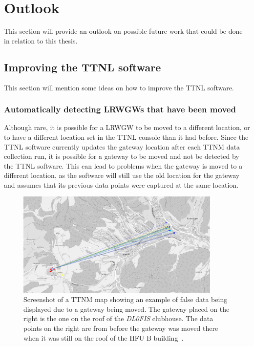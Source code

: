 \section{Outlook}

This section will provide an outlook on possible future work that could be done in relation to this thesis.

\subsection{Improving the \acl{TTNL} software}

This section will mention some ideas on how to improve the \ac{TTNL} software.

\subsubsection{Automatically detecting \aclp{LRWGW} that have been moved}

Although rare, it is possible for a \acl{LRWGW} to be moved to a different location, or to have a different location set in the \ac{TTNL} console than it had before.
Since the \ac{TTNL} software currently updates the gateway location after each \ac{TTNM} data collection run, it is possible for a gateway to be moved and not be detected by the \ac{TTNL} software.
This can lead to problems when the gateway is moved to a different location, as the software will still use the old location for the gateway and assumes that its previous data points were captured at the same location.

\begin{figure}[htbp]
    \centering
    \includegraphics[width=0.9\textwidth]{pictures/ttn-mapper/moved_gateway_example.png}
    \caption{
        Screenshot of a \ac{TTNM} map showing an example of false data being displayed due to a gateway being moved.
        The gateway placed on the right is the one on the roof of the \emph{DL0FIS} clubhouse.
        The data points on the right are from before the gateway was moved there when it was still on the roof of the \ac{HFU} B building~\cite{ttn_mapper_ttn_2023}.
    }\label{pic:gateway-moved-example}
\end{figure}

